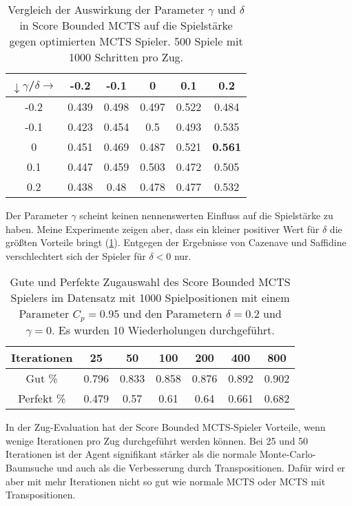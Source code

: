 \begin{table}[h!]
	\centering
	\begin{tabular}{|c||c|c|c|c|c|}
		\hline
		$\downarrow\gamma$/$\delta \rightarrow$ & -0.2 & -0.1 & 0 & 0.1 & 0.2 \\
		\hline
		\hline
		-0.2 & 0.439 & 0.498 & 0.497 & 0.522 & 0.484 \\
		\hline
		-0.1 & 0.423 & 0.454 & 0.5 & 0.493 & 0.535 \\
		\hline
		0 & 0.451 & 0.469 & 0.487 & 0.521 & \textbf{0.561} \\
		\hline
		0.1 & 0.447 & 0.459 & 0.503 & 0.472 & 0.505 \\
		\hline
		0.2 & 0.438 & 0.48 & 0.478 & 0.477 & 0.532 \\
		\hline
	\end{tabular}
	\caption{Vergleich der Auswirkung der Parameter $\gamma$ und $\delta$ in Score Bounded MCTS auf die Spielstärke gegen optimierten MCTS Spieler. 500 Spiele mit 1000 Schritten pro Zug.}
	\label{tab:score-bounded-best-params}
\end{table}

Der Parameter $\gamma$ scheint keinen nennenswerten Einfluss auf die Spielstärke zu haben. 
Meine Experimente zeigen aber, dass ein kleiner positiver Wert für $\delta$ die größten Vorteile bringt (\cref{tab:score-bounded-best-params}).
Entgegen der Ergebnisse von Cazenave und Saffidine verschlechtert sich der Spieler für $\delta < 0$ nur.

\begin{table}[h!]
	\centering
	\begin{tabular}{|c||c|c|c|c|c|c|}
		\hline
		Iterationen & 25 & 50 & 100 & 200 & 400 & 800 \\
		\hline
		Gut \% & 0.796 & 0.833 & 0.858 & 0.876 & 0.892 & 0.902 \\
		\hline
		Perfekt \% & 0.479 & 0.57 & 0.61 & 0.64 & 0.661 & 0.682 \\
		\hline
	\end{tabular}
	\caption{Gute und Perfekte Zugauswahl des Score Bounded MCTS Spielers im Datensatz mit 1000 Spielpositionen mit einem Parameter $C_p=0.95$ und den Parametern $\delta=0.2$ und $\gamma=0$. Es wurden 10 Wiederholungen durchgeführt.}
\label{tab:score-bounded-move-eval}
\end{table}

In der Zug-Evaluation hat der Score Bounded MCTS-Spieler Vorteile, wenn wenige Iterationen pro Zug durchgeführt werden können. 
Bei 25 und 50 Iterationen ist der Agent signifikant stärker als die normale Monte-Carlo-Baumsuche und auch als die Verbesserung durch Transpositionen.
Dafür wird er aber mit mehr Iterationen nicht so gut wie normale MCTS oder MCTS mit Transpositionen.

